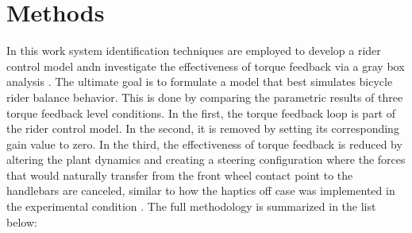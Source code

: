 \section{Methods}
  In this work system identification techniques are employed to develop a rider control model andn  investigate the effectiveness of torque feedback via a gray box analysis . The ultimate goal is to formulate a model that best simulates bicycle rider balance behavior. This is done by comparing the parametric  results of  three torque feedback level conditions. In the first, the torque feedback loop is part of the rider control model. In the second, it is removed by setting its corresponding gain value to zero. In the third, the effectiveness of torque feedback is reduced by altering the plant dynamics and creating a steering configuration where the forces that would naturally transfer from the front wheel contact point to the handlebars are canceled, similar to how the haptics off case was implemented in the experimental condition \cite{dialynaseffect}. The full methodology is summarized in the list below:
